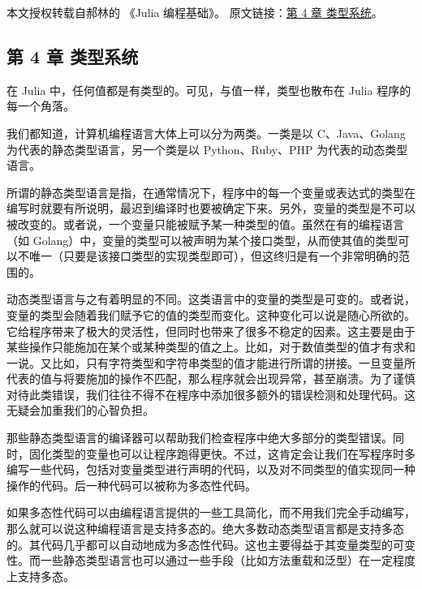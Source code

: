 
本文授权转载自郝林的 《Julia 编程基础》。 原文链接：\href{https://github.com/hyper0x/JuliaBasics/blob/master/book/ch04.md}{第 4 章 类型系统}。

\subsection{第 4 章 类型系统}

在 Julia 中，任何值都是有类型的。可见，与值一样，类型也散布在 Julia 程序的每一个角落。

我们都知道，计算机编程语言大体上可以分为两类。一类是以 C、Java、Golang 为代表的静态类型语言，另一个类是以 Python、Ruby、PHP 为代表的动态类型语言。

所谓的静态类型语言是指，在通常情况下，程序中的每一个变量或表达式的类型在编写时就要有所说明，最迟到编译时也要被确定下来。另外，变量的类型是不可以被改变的。或者说，一个变量只能被赋予某一种类型的值。虽然在有的编程语言（如 Golang）中，变量的类型可以被声明为某个接口类型，从而使其值的类型可以不唯一（只要是该接口类型的实现类型即可），但这终归是有一个非常明确的范围的。

动态类型语言与之有着明显的不同。这类语言中的变量的类型是可变的。或者说，变量的类型会随着我们赋予它的值的类型而变化。这种变化可以说是随心所欲的。它给程序带来了极大的灵活性，但同时也带来了很多不稳定的因素。这主要是由于某些操作只能施加在某个或某种类型的值之上。比如，对于数值类型的值才有求和一说。又比如，只有字符类型和字符串类型的值才能进行所谓的拼接。一旦变量所代表的值与将要施加的操作不匹配，那么程序就会出现异常，甚至崩溃。为了谨慎对待此类错误，我们往往不得不在程序中添加很多额外的错误检测和处理代码。这无疑会加重我们的心智负担。

那些静态类型语言的编译器可以帮助我们检查程序中绝大多部分的类型错误。同时，固化类型的变量也可以让程序跑得更快。不过，这肯定会让我们在写程序时多编写一些代码，包括对变量类型进行声明的代码，以及对不同类型的值实现同一种操作的代码。后一种代码可以被称为多态性代码。

如果多态性代码可以由编程语言提供的一些工具简化，而不用我们完全手动编写，那么就可以说这种编程语言是支持多态的。绝大多数动态类型语言都是支持多态的。其代码几乎都可以自动地成为多态性代码。这也主要得益于其变量类型的可变性。而一些静态类型语言也可以通过一些手段（比如方法重载和泛型）在一定程度上支持多态。